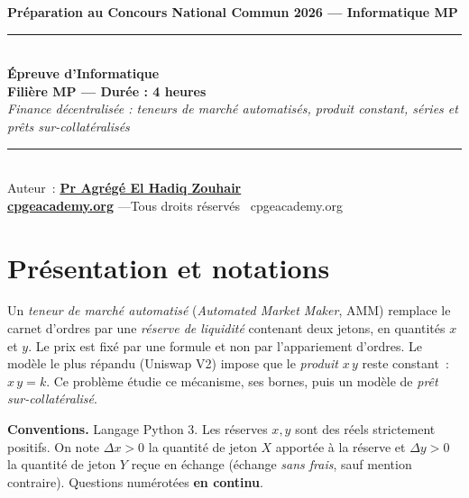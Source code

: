 \documentclass[11pt,a4paper]{article}
\begin{document}
\begin{center}
{\large\bfseries Préparation au Concours National Commun 2026 --- Informatique MP}\\[8pt]
\rule{0.9\linewidth}{0.5pt}\\[6pt]
{\Large\bfseries Épreuve d'Informatique}\\[4pt]
{\bfseries Filière MP --- Durée : 4 heures}\\[6pt]
{\itshape Finance décentralisée : teneurs de marché automatisés, produit constant, séries et prêts sur-collatéralisés}\\[6pt]
\rule{0.9\linewidth}{0.5pt}\\[8pt]
{\small Auteur~: \href{https://orcid.org/0000-0002-6108-7176}{\textbf{Pr Agrégé El Hadiq Zouhair}}}\\[3pt]
{\small \href{https://cpgeacademy.org}{\textbf{cpgeacademy.org}} \quad---\quad Tous droits réservés \textcopyright\ cpgeacademy.org}
\end{center}
\medskip
\begin{center}
\end{center}

\bigskip
\section*{Présentation et notations}

Un \emph{teneur de marché automatisé} (\emph{Automated Market Maker}, AMM) remplace le carnet
d'ordres par une \emph{réserve de liquidité} contenant deux jetons, en quantités $x$ et $y$. Le
prix est fixé par une formule et non par l'appariement d'ordres. Le modèle le plus répandu
(Uniswap V2) impose que le \emph{produit} $x\,y$ reste constant~: $x\,y = k$. Ce problème étudie
ce mécanisme, ses bornes, puis un modèle de \emph{prêt sur-collatéralisé}.

\noindent\textbf{Conventions.} Langage Python 3. Les réserves $x,y$ sont des réels
strictement positifs. On note $\Delta x > 0$ la quantité de jeton $X$ apportée à la réserve et
$\Delta y > 0$ la quantité de jeton $Y$ reçue en échange (échange \emph{sans frais}, sauf mention
contraire). Questions numérotées \textbf{en continu}.
\end{document}
